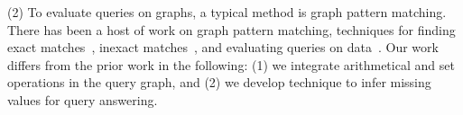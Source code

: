 \noindent (2) To evaluate queries on graphs, a typical method is graph pattern matching. There has been a host of work
on graph pattern matching, \eg techniques for finding exact matches~\cite{cordella2004sub-full,subiso76}, inexact matches~\cite{ZouCO09,TianP08}, and evaluating  queries on  data~\cite{WagnerTLHS12}. Our work differs from the prior work in the following: (1) we integrate arithmetical and set operations in the query graph, and (2) we develop technique to infer missing values for query answering. 


